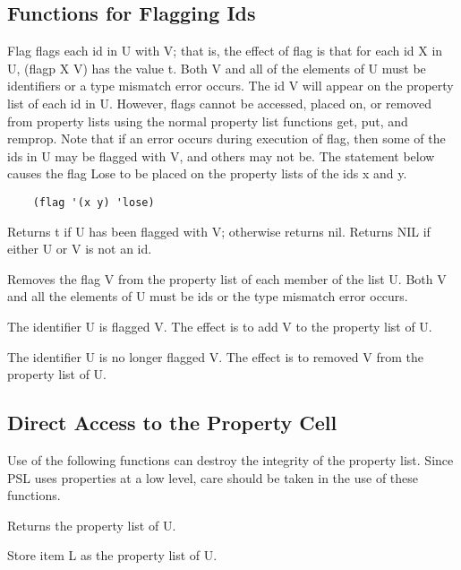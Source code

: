 \subsection{Functions for Flagging Ids}

{    Flag flags each id in U with V; that is, the effect of  flag
    is  that  for  each  id X in U, (flagp X V) has the value t.
    Both V and all of the elements of U must be identifiers or a
    type mismatch error occurs.  The id V  will  appear  on  the
    property  list  of  each  id in U.  However, flags cannot be
    accessed, placed on, or removed from  property  lists  using
    the  normal  property  list functions get, put, and remprop.
    Note that if an error occurs during execution of flag,  then
    some  of  the ids in U may be flagged with V, and others may
    not be.  The statement below causes  the  flag  Lose  to  be
    placed on the property lists of the ids x and y.
}
\begin{verbatim}
    (flag '(x y) 'lose)
\end{verbatim}
{    Returns  t  if  U has been flagged with V; otherwise returns
    nil.  Returns NIL if either U or V is not an id.
}

{    Removes the flag V from the property list of each member  of
    the list U.  Both V and all the elements of U must be ids or
    the type mismatch error occurs.
}

{    The  identifier  U  is flagged V.  The effect is to add V to
    the property list of U.
}

{    The identifier U is no longer flagged V.  The effect  is  to
    removed V from the property list of U.
}
\subsection{Direct Access to the Property Cell}

  Use  of  the  following functions can destroy the integrity of
the property list.  Since PSL uses properties at  a  low  level,
care should be taken in the use of these functions.


{    Returns the property list of U.
}

{    Store item L as the property list of U.
}
